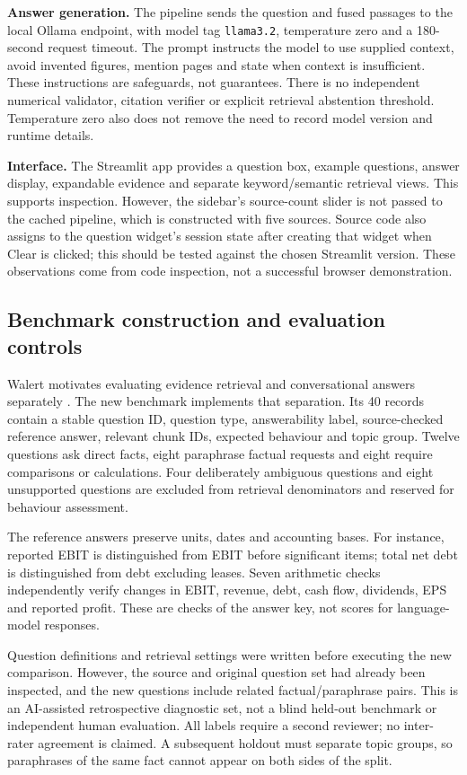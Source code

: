 \documentclass[11pt,a4paper]{article}
\begin{document}
\textbf{Answer generation.} The pipeline sends the question and fused passages to the local Ollama endpoint, with model tag \texttt{llama3.2}, temperature zero and a 180-second request timeout. The prompt instructs the model to use supplied context, avoid invented figures, mention pages and state when context is insufficient. These instructions are safeguards, not guarantees. There is no independent numerical validator, citation verifier or explicit retrieval abstention threshold. Temperature zero also does not remove the need to record model version and runtime details.

\textbf{Interface.} The Streamlit app provides a question box, example questions, answer display, expandable evidence and separate keyword/semantic retrieval views. This supports inspection. However, the sidebar's source-count slider is not passed to the cached pipeline, which is constructed with five sources. Source code also assigns to the question widget's session state after creating that widget when Clear is clicked; this should be tested against the chosen Streamlit version. These observations come from code inspection, not a successful browser demonstration.

\subsection{Benchmark construction and evaluation controls}
Walert motivates evaluating evidence retrieval and conversational answers separately \cite{walertrepo,walertproject}. The new benchmark implements that separation. Its 40 records contain a stable question ID, question type, answerability label, source-checked reference answer, relevant chunk IDs, expected behaviour and topic group. Twelve questions ask direct facts, eight paraphrase factual requests and eight require comparisons or calculations. Four deliberately ambiguous questions and eight unsupported questions are excluded from retrieval denominators and reserved for behaviour assessment.

The reference answers preserve units, dates and accounting bases. For instance, reported EBIT is distinguished from EBIT before significant items; total net debt is distinguished from debt excluding leases. Seven arithmetic checks independently verify changes in EBIT, revenue, debt, cash flow, dividends, EPS and reported profit. These are checks of the answer key, not scores for language-model responses.

Question definitions and retrieval settings were written before executing the new comparison. However, the source and original question set had already been inspected, and the new questions include related factual/paraphrase pairs. This is an AI-assisted retrospective diagnostic set, not a blind held-out benchmark or independent human evaluation. All labels require a second reviewer; no inter-rater agreement is claimed. A subsequent holdout must separate topic groups, so paraphrases of the same fact cannot appear on both sides of the split.
\end{document}
